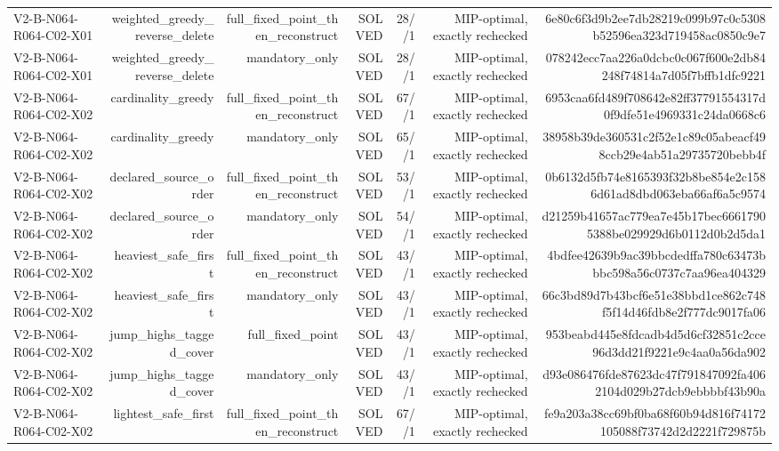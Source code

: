 {\begin{longtable}{lrrrrrr}
V2-B-N064-R064-C02-X01 & weighted\_greedy\_reverse\_delete & full\_fixed\_point\_then\_reconstruct & SOLVED & 28//1 & MIP-optimal, exactly rechecked & 6e80c6f3d9b2ee7db28219c099b97c0c5308b52596ea323d719458ac0850c9e7 \\
V2-B-N064-R064-C02-X01 & weighted\_greedy\_reverse\_delete & mandatory\_only & SOLVED & 28//1 & MIP-optimal, exactly rechecked & 078242ecc7aa226a0dcbc0c067f600e2db84248f74814a7d05f7bffb1dfc9221 \\
V2-B-N064-R064-C02-X02 & cardinality\_greedy & full\_fixed\_point\_then\_reconstruct & SOLVED & 67//1 & MIP-optimal, exactly rechecked & 6953caa6fd489f708642e82ff37791554317d0f9dfe51e4969331c24da0668c6 \\
V2-B-N064-R064-C02-X02 & cardinality\_greedy & mandatory\_only & SOLVED & 65//1 & MIP-optimal, exactly rechecked & 38958b39de360531c2f52e1c89c05abeacf498ccb29e4ab51a29735720bebb4f \\
V2-B-N064-R064-C02-X02 & declared\_source\_order & full\_fixed\_point\_then\_reconstruct & SOLVED & 53//1 & MIP-optimal, exactly rechecked & 0b6132d5fb74e8165393f32b8be854e2c1586d61ad8dbd063eba66af6a5c9574 \\
V2-B-N064-R064-C02-X02 & declared\_source\_order & mandatory\_only & SOLVED & 54//1 & MIP-optimal, exactly rechecked & d21259b41657ac779ea7e45b17bec66617905388be029929d6b0112d0b2d5da1 \\
V2-B-N064-R064-C02-X02 & heaviest\_safe\_first & full\_fixed\_point\_then\_reconstruct & SOLVED & 43//1 & MIP-optimal, exactly rechecked & 4bdfee42639b9ac39bbcdedffa780c63473bbbc598a56c0737c7aa96ea404329 \\
V2-B-N064-R064-C02-X02 & heaviest\_safe\_first & mandatory\_only & SOLVED & 43//1 & MIP-optimal, exactly rechecked & 66c3bd89d7b43bcf6e51e38bbd1ce862c748f5f14d46fdb8e2f777dc9017fa06 \\
V2-B-N064-R064-C02-X02 & jump\_highs\_tagged\_cover & full\_fixed\_point & SOLVED & 43//1 & MIP-optimal, exactly rechecked & 953beabd445e8fdcadb4d5d6cf32851c2cce96d3dd21f9221e9c4aa0a56da902 \\
V2-B-N064-R064-C02-X02 & jump\_highs\_tagged\_cover & mandatory\_only & SOLVED & 43//1 & MIP-optimal, exactly rechecked & d93e086476fde87623dc47f791847092fa4062104d029b27dcb9ebbbbf43b90a \\
V2-B-N064-R064-C02-X02 & lightest\_safe\_first & full\_fixed\_point\_then\_reconstruct & SOLVED & 67//1 & MIP-optimal, exactly rechecked & fe9a203a38cc69bf0ba68f60b94d816f74172105088f73742d2d2221f729875b \\

\end{longtable}}
